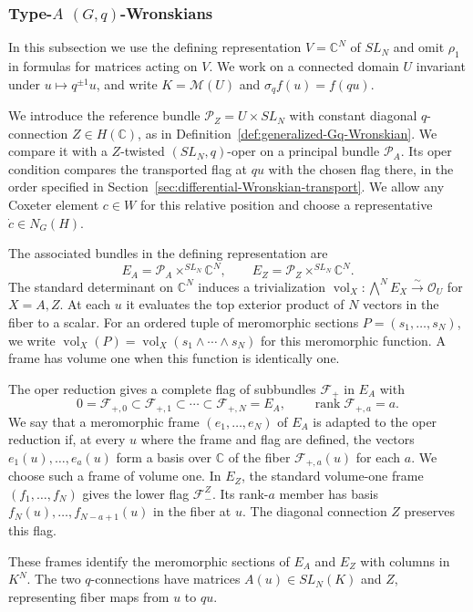 \documentclass[11pt,leqno]{amsart}
\numberwithin{equation}{section}
\theoremstyle{plain}
\theoremstyle{definition}
\theoremstyle{plain}
\theoremstyle{definition}
\theoremstyle{remark}
\begin{document}
\subsubsection{Type-$A$ \texorpdfstring{$(G,q)$}{(G,q)}-Wronskians}
In this subsection we use the defining representation $V=\mathbb C^N$ of $SL_N$ and omit $\rho_1$ in formulas for matrices acting on $V$. We work on a connected domain $U$ invariant under $u\mapsto q^{\pm1}u$, and write $K=\mathcal M(U)$ and $\sigma_q f(u)=f(qu)$.

We introduce the reference bundle $\mathcal P_Z=U\times SL_N$ with constant diagonal $q$-connection $Z\in H(\mathbb C)$, as in Definition~\ref{def:generalized-Gq-Wronskian}. We compare it with a $Z$-twisted $(SL_N,q)$-oper on a principal bundle $\mathcal P_A$. Its oper condition compares the transported flag at $qu$ with the chosen flag there, in the order specified in Section~\ref{sec:differential-Wronskian-transport}. We allow any Coxeter element $c\in W$ for this relative position and choose a representative $\dot c\in N_G(H)$.

The associated bundles in the defining representation are
\[
 E_A=\mathcal P_A\times^{SL_N}\mathbb C^N,
 \qquad E_Z=\mathcal P_Z\times^{SL_N}\mathbb C^N.
\]
The standard determinant on $\mathbb C^N$ induces a trivialization $\operatorname{vol}_X:\bigwedge^N E_X\xrightarrow{\sim}\mathcal O_U$ for $X=A,Z$.  At each $u$ it evaluates the top exterior product of $N$ vectors in the fiber to a scalar.  For an ordered tuple of meromorphic sections $P=(s_1,\ldots,s_N)$, we write $\operatorname{vol}_X(P)=\operatorname{vol}_X(s_1\wedge\cdots\wedge s_N)$ for this meromorphic function.  A frame has volume one when this function is identically one.

The oper reduction gives a complete flag of subbundles $\mathcal F_+$ in $E_A$ with
\[
 0=\mathcal F_{+,0}\subset\mathcal F_{+,1}\subset\cdots
   \subset\mathcal F_{+,N}=E_A,
 \qquad \operatorname{rank}\mathcal F_{+,a}=a.
\]
We say that a meromorphic frame $(e_1,\ldots,e_N)$ of $E_A$ is adapted to the oper reduction if, at every $u$ where the frame and flag are defined, the vectors $e_1(u),\ldots,e_a(u)$ form a basis over $\mathbb C$ of the fiber $\mathcal F_{+,a}(u)$ for each $a$.  We choose such a frame of volume one.  In $E_Z$, the standard volume-one frame $(f_1,\ldots,f_N)$ gives the lower flag $\mathcal F_-^Z$. Its rank-$a$ member has basis $f_N(u),\ldots,f_{N-a+1}(u)$ in the fiber at $u$.  The diagonal connection $Z$ preserves this flag.

These frames identify the meromorphic sections of $E_A$ and $E_Z$ with columns in $K^N$.  The two $q$-connections have matrices $A(u)\in SL_N(K)$ and $Z$, representing fiber maps from $u$ to $qu$.
\end{document}
